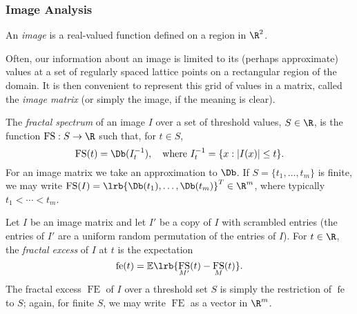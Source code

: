 \documentclass{article}
\DeclareMathOperator{\fe}{fe}
\DeclareMathOperator{\FE}{FE}
\DeclareMathOperator{\FS}{FS}
\begin{document}
\subsubsection*{Image Analysis}
An \emph{image} is a real-valued function defined on a region in $\R^2$.

Often, our information about an image is limited to its (perhaps approximate) values at a set of regularly spaced lattice points on a rectangular region of the domain. It is then  convenient to represent this grid of values in a matrix, called the \emph{image matrix} (or simply the image, if the meaning is clear).

The \emph{fractal spectrum} of an image $I$ over a set of threshold values, $S\in\R$,  is the function $\FS:S\to\R$ such that, for $t\in S$,
$$\FS(t)= \Db(I_t^{-1}),\quad\text{where }I_t^{-1}=\{x:|I(x)|\leq t\}.$$
For an image matrix we take an approximation to $\Db$. If $S=\{t_1,\ldots,t_m\}$ is finite, we may write
$\FS(I)=\lrb{\Db(t_1),\ldots,\Db(t_m)}^T\in\R^m$, where typically $t_1<\cdots<t_m$.

Let $I$ be an image matrix and let $I'$ be a copy of $I$ with scrambled entries (the entries of $I'$ are a uniform random permutation of the entries of $I$). For $t\in\R$, the \emph{fractal excess} of $I$ at $t$ is the expectation
$$\fe(t)=\mathbb{E}\lrb{\FS_{M'}(t)-\FS_M(t)}.$$
The fractal excess $\FE$ of $I$ over a threshold set $S$ is simply the restriction of $\fe$ to $S$; again, for finite $S$, we may write $\FE$ as a vector in $\R^m$.
\end{document}

